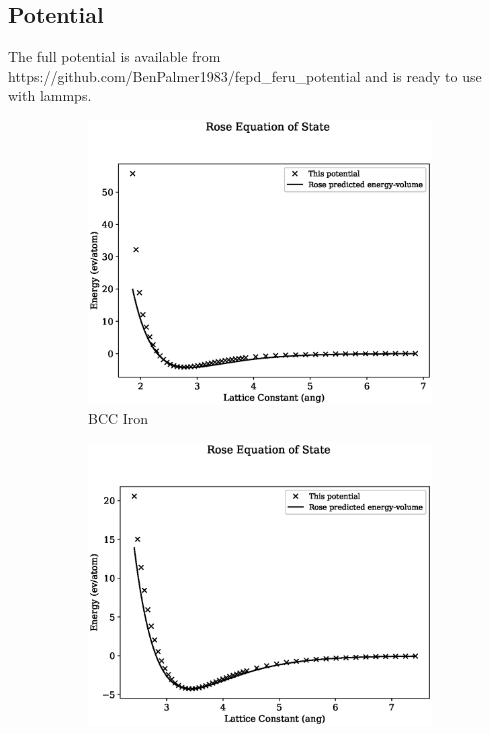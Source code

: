 \subsection{Potential}

The full potential is available from https://github.com/BenPalmer1983/fepd\_feru\_potential and is ready to use with \acrshort{lammps}.



\begin{figure}[htb]
\begin{subfigure}{.32\textwidth}
  \centering
  \includegraphics[width=.94\linewidth]{chapters/potentials_fe_pd_ru/fepd_potential/rose_plot_bp_0.eps}  
  \caption{BCC Iron}
  \label{fig:sub-first}
\end{subfigure}
\begin{subfigure}{.32\textwidth}
  \centering
  \includegraphics[width=.94\linewidth]{chapters/potentials_fe_pd_ru/fepd_potential/rose_plot_bp_1.eps}  

\end{subfigure}
\end{figure}
